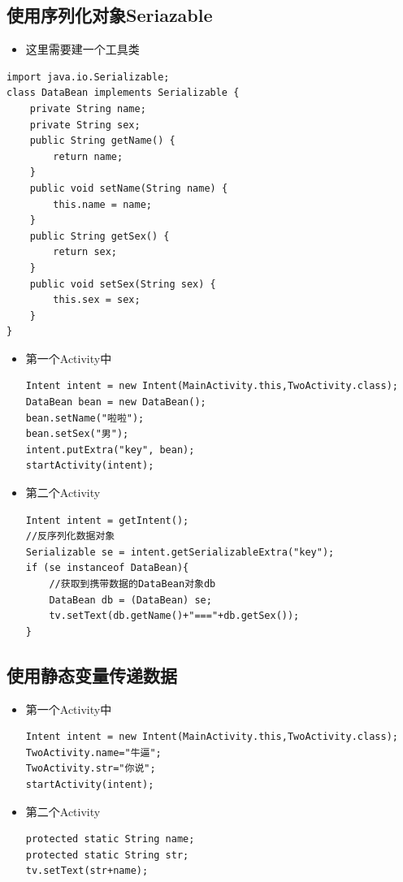 \documentclass[9pt, b5paaper]{book}
\begin{document}
\subsection{使用序列化对象Seriazable}
\label{sec-1-6-5}
\begin{itemize}
\item 这里需要建一个工具类
\end{itemize}
\begin{verbatim}
import java.io.Serializable;
class DataBean implements Serializable {
    private String name;
    private String sex;
    public String getName() {
        return name;
    }
    public void setName(String name) {
        this.name = name;
    }
    public String getSex() {
        return sex;
    }
    public void setSex(String sex) {
        this.sex = sex;
    }
}
\end{verbatim}
\begin{itemize}
\item 第一个Activity中
\begin{verbatim}
Intent intent = new Intent(MainActivity.this,TwoActivity.class);
DataBean bean = new DataBean();
bean.setName("啦啦");
bean.setSex("男");
intent.putExtra("key", bean);
startActivity(intent);
\end{verbatim}
\item 第二个Activity
\begin{verbatim}
Intent intent = getIntent();
//反序列化数据对象
Serializable se = intent.getSerializableExtra("key");
if (se instanceof DataBean){
    //获取到携带数据的DataBean对象db
    DataBean db = (DataBean) se;
    tv.setText(db.getName()+"==="+db.getSex());
}
\end{verbatim}
\end{itemize}
\subsection{使用静态变量传递数据}
\label{sec-1-6-6}
\begin{itemize}
\item 第一个Activity中
\begin{verbatim}
Intent intent = new Intent(MainActivity.this,TwoActivity.class);
TwoActivity.name="牛逼";
TwoActivity.str="你说";
startActivity(intent);
\end{verbatim}
\item 第二个Activity
\begin{verbatim}
protected static String name;
protected static String str;
tv.setText(str+name);
\end{verbatim}
\end{itemize}
\end{document}
